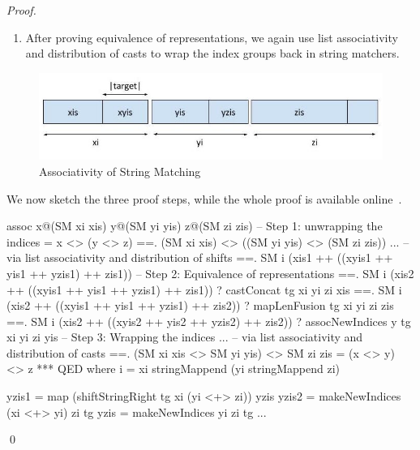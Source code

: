 \begin{proof}
\begin{enumerate}
\begin{code}
zis2 = map (shiftStringRight tg (xi stringMappend yi) zi) zis
\end{code}
That is, in right first, the indices of @z@ are first shifted
by the length of @yi@ and then by the length of @xi@,
while in the left first case, the indices of @z@ are shifted by the
length of @xi stringMappend yi@.
In this second step of the proof we prove, using lemmata,
the equivalence of the different group representations.
%
The most interesting lemma we use is called @assocNewIndices@ and proves
equivalence of all the three middle groups together
by case analysis on the relative lengths of the target @tg@ and the middle string @yi@.
\item After proving equivalence of representations,
we again use list associativity and distribution of casts to wrap the
index groups back in string matchers.
\end{enumerate}
\begin{figure}
\includegraphics[scale=0.5]{text/stringmatcher/AssociativeIndices}
\caption{Associativity of String Matching}
\label{fig:mappend:assoc}
\end{figure}
We now sketch the three proof steps, while the whole proof
is available online~\cite{implementation}.
\begin{code}
assoc x@(SM xi xis) y@(SM yi yis) z@(SM zi zis)
  -- Step 1: unwrapping the indices
  =   x <> (y <> z)
  ==. (SM xi xis) <> ((SM yi yis) <> (SM zi zis))
                         ...
  -- via list associativity and distribution of shifts
  ==. SM i (xis1 ++ ((xyis1 ++ yis1 ++ yzis1) ++ zis1))
  -- Step 2: Equivalence of representations
  ==. SM i (xis2 ++ ((xyis1 ++ yis1 ++ yzis1) ++ zis1))
      ? castConcat tg xi yi zi xis
  ==. SM i (xis2 ++ ((xyis1 ++ yis1 ++ yzis1) ++ zis2))
      ? mapLenFusion tg xi yi zi zis
  ==. SM i (xis2 ++ ((xyis2 ++ yis2 ++ yzis2) ++ zis2))
      ? assocNewIndices y tg xi yi zi yis
  -- Step 3: Wrapping the indices
                         ...
  -- via list associativity and distribution of casts
  ==. (SM xi xis <> SM yi yis) <> SM zi zis
  =   (x <> y) <> z
  *** QED
  where
    i     = xi stringMappend (yi stringMappend zi)

    yzis1 = map (shiftStringRight tg xi (yi <+> zi)) yzis
    yzis2 = makeNewIndices (xi <+> yi) zi tg
    yzis  = makeNewIndices yi zi tg
    ...
\end{code}
\qed\end{proof}
